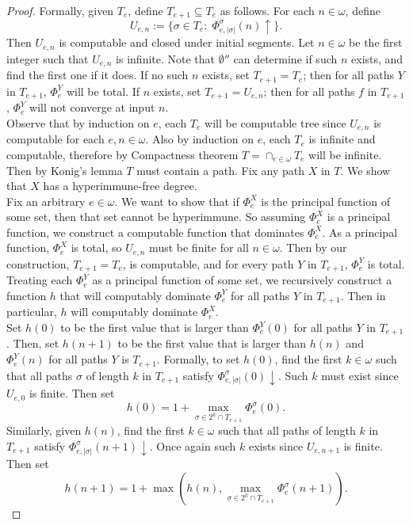 \documentclass{article}
\begin{document}
\begin{enumerate}
\begin{proof}
      Formally, given $T_e$, define $T_{e+1}\subseteq T_e$ as follows.
      For each $n\in\omega$, define
      \[U_{e,n} :=\{\sigma\in T_e:\;
      \Phi_{e,|\sigma|}^\sigma(n)\uparrow\}.\]
      Then $U_{e,n}$ is computable and closed under initial segments. Let
      $n\in\omega$ be the first integer such that $U_{e,n}$ is infinite.
      Note that $\emptyset''$ can determine if such $n$ exists, and find
      the first one if it does. If no such $n$ exists, set $T_{e+1}=T_e$;
      then for all paths $Y$ in $T_{e+1}$, $\Phi^Y_e$ will be total.
      If $n$ exists, set $T_{e+1}=U_{e,n}$; then for all paths $f$ in
      $T_{e+1}$, $\Phi^Y_e$ will not converge at input $n$. \\

      Observe that by induction on $e$, each $T_e$ will be computable tree
      since $U_{e,n}$ is computable for each $e,n\in\omega$. Also by
      induction on $e$, each $T_e$ is infinite and computable, therefore by
      Compactness theorem $T=\cap_{e\in\omega}T_e$ will be infinite. Then
      by Konig's lemma $T$ must contain a path. Fix any path $X$ in $T$. We
      show that $X$ has a hyperimmune-free degree. \\

      Fix an arbitrary $e\in\omega$. We want to show that if $\Phi_e^X$ is
      the principal function of some set, then that set cannot be
      hyperimmune. So assuming $\Phi_e^X$ is a principal function,
      we construct a computable function that dominates
      $\Phi_e^X$. As a principal function, $\Phi_e^X$ is total, so
      $U_{e,n}$ must be finite for all $n\in\omega$. Then by our
      construction, $T_{e+1}=T_e$, is computable, and for every path $Y$ in
      $T_{e+1}$, $\Phi^Y_e$ is total. Treating each $\Phi^Y_e$ as a
      principal function of some set, we recursively construct a function
      $h$ that will computably dominate $\Phi^Y_e$ for all paths $Y$ in
      $T_{e+1}$. Then in particular, $h$ will computably dominate
      $\Phi^X_e$. \\

      Set $h(0)$ to be the first value that is larger than $\Phi^Y_e(0)$
      for all paths $Y$ in $T_{e+1}$. Then, set $h(n+1)$ to be the first
      value that is larger than $h(n)$ and $\Phi^Y_e(n)$ for all paths
      $Y$ is $T_{e+1}$. Formally, to set $h(0)$, find the first
      $k\in\omega$ such that all paths $\sigma$ of length $k$ in
      $T_{e+1}$ satisfy $\Phi^\sigma_{e,|\sigma|}(0)\downarrow$. Such $k$
      must exist since $U_{e,0}$ is finite. Then set
      \[h(0) =1+\max_{\sigma\in 2^k\cap T_{e+1}} \Phi^\sigma_e(0).\]
      Similarly, given $h(n)$, find the first $k\in\omega$ such that all
      paths of length $k$ in $T_{e+1}$ satisfy
      $\Phi^\sigma_{e,|\sigma|}(n+1)\downarrow$. Once again such $k$ exists
      since $U_{e,n+1}$ is finite. Then set
      \[h(n+1) =1+ \max \left(h(n), \max_{\sigma\in 2^k\cap T_{e+1}}
      \Phi^\sigma_e(n+1) \right).\]
    \end{proof}


\end{enumerate}
\end{document}
